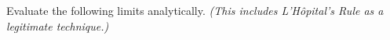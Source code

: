 \documentclass[12pt, addpoints]{exam}
\newcommand{\vstr}{\vspace{\stretch{1}}}
\theoremstyle{plain}
\begin{document}
\begin{questions}





\newpage
\question Evaluate the following limits analytically. \emph{(This includes L'H\^opital's Rule as a legitimate technique.)}  

\begin{parts}


\end{parts}
\end{questions}
\end{document}
